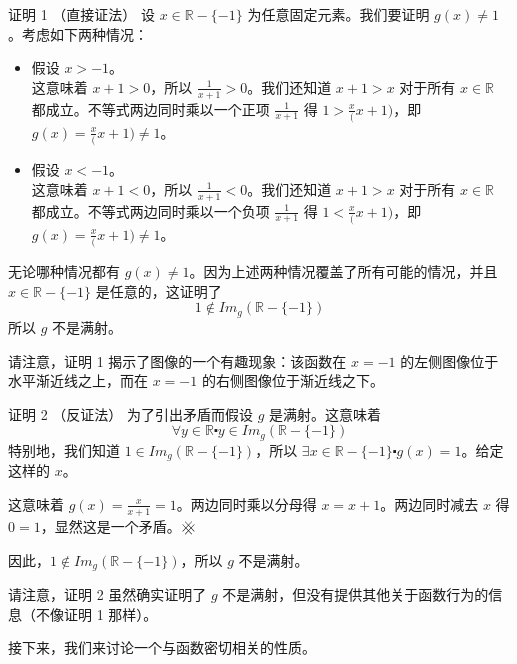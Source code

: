\begin{example}
    \begin{proofs}{证明 1 （直接证法）}
        设 $x \in \mathbb{R} - \{-1\}$ 为任意固定元素。我们要证明 $g(x) \ne 1$。考虑如下两种情况：
        \begin{itemize}
            \item 假设 $x > -1$。\\
                这意味着 $x+1>0$，所以 $\frac{1}{x+1}>0$。我们还知道 $x+1>x$ 对于所有 $x \in \mathbb{R}$ 都成立。不等式两边同时乘以一个正项 $\frac{1}{x+1}$ 得 $1 > \frac{x}(x+1)$，即 $g(x) = \frac{x}(x+1) \ne 1$。
            \item 假设 $x < -1$。\\
                这意味着 $x+1<0$，所以 $\frac{1}{x+1}<0$。我们还知道 $x+1>x$ 对于所有 $x \in \mathbb{R}$ 都成立。不等式两边同时乘以一个负项 $\frac{1}{x+1}$ 得 $1 < \frac{x}(x+1)$，即 $g(x) =  \frac{x}(x+1) \ne 1$。
        \end{itemize}
        无论哪种情况都有 $g(x) \ne 1$。因为上述两种情况覆盖了所有可能的情况，并且 $x \in \mathbb{R} - \{-1\}$ 是任意的，这证明了
        \[1 \notin Im_g(\mathbb{R} - \{-1\})\]
        所以 $g$ 不是满射。
    \end{proofs}

    请注意，证明 1 揭示了图像的一个有趣现象：该函数在 $x = -1$ 的左侧图像位于水平渐近线之上，而在 $x = -1$ 的右侧图像位于渐近线之下。

    \begin{proofs}{证明 2 （反证法）}
        为了引出矛盾而假设 $g$ 是满射。这意味着
        \[\forall y \in \mathbb{R} \centerdot y \in Im_g(\mathbb{R} - \{-1\})\]
        特别地，我们知道 $1 \in Im_g(\mathbb{R} - \{-1\})$，所以 $\exists x \in \mathbb{R} - \{-1\} \centerdot g(x) = 1$。给定这样的 $x$。

        这意味着 $g(x) = \frac{x}{x+1} = 1$。两边同时乘以分母得 $x = x + 1$。两边同时减去 $x$ 得 $0 = 1$，显然这是一个矛盾。$
        \hashx$

        因此，$1 \notin Im_g(\mathbb{R} - \{-1\})$，所以 $g$ 不是满射。
    \end{proofs}

    请注意，证明 2 虽然确实证明了 $g$ 不是满射，但没有提供其他关于函数行为的信息（不像证明 1 那样）。

    接下来，我们来讨论一个与函数密切相关的性质。
\end{example}